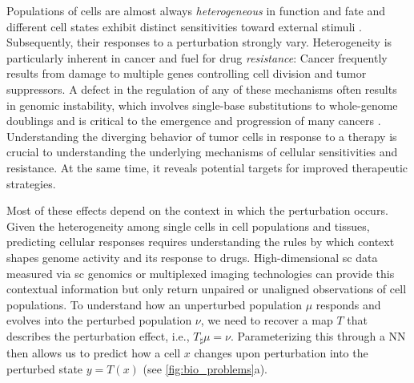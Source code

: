 Populations of cells are almost always \emph{heterogeneous} in function and fate and different cell states exhibit distinct sensitivities toward external stimuli \citep{spiller2010measurement}.
Subsequently, their responses to a perturbation strongly vary.
Heterogeneity is particularly inherent in cancer and fuel for drug \emph{resistance}: 
Cancer frequently results from damage to multiple genes controlling cell division and tumor suppressors.
A defect in the regulation of any of these mechanisms often results in genomic instability, which involves single-base substitutions to whole-genome doublings and
is critical to the emergence and progression of many cancers \citep{dagogo2018tumour}. Understanding the diverging behavior of tumor cells in response to a therapy is crucial to understanding the underlying mechanisms of cellular sensitivities and resistance.
At the same time, it reveals potential targets for improved therapeutic strategies.

Most of these effects depend on the context in which the perturbation occurs. Given the heterogeneity among single cells in cell populations and tissues, predicting cellular responses requires understanding the rules by which context shapes genome activity and its response to drugs. High-dimensional \acrlong{sc} data measured via \acrlong{sc} genomics or multiplexed imaging technologies can provide this contextual information but only return unpaired or unaligned observations of cell populations.
To understand how an unperturbed population $\mu$ responds and evolves into the perturbed population $\nu$, we need to recover a map $T$ that describes the perturbation effect, i.e., $T_\sharp \mu = \nu$. Parameterizing this through a \acrlong{NN} then allows us to predict how a cell $x$ changes upon perturbation into the perturbed state $y= T(x)$ (see \cref{fig:bio_problems}a).



